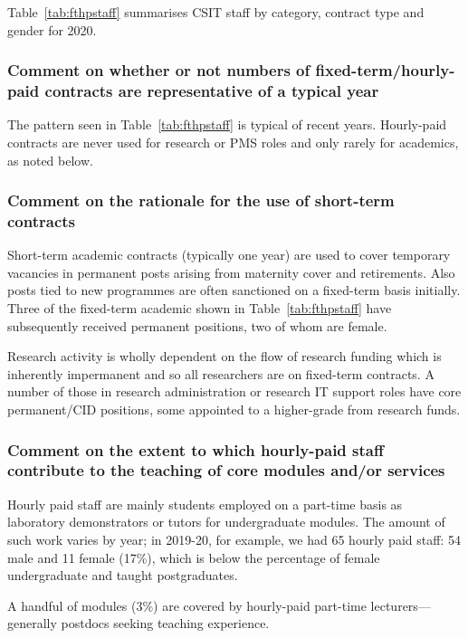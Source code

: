 Table~\ref{tab:fthpstaff} summarises CSIT staff by category, contract 
type and gender for 2020.



\subsubsection{Comment on whether or not numbers of fixed-term/hourly-paid contracts are representative of a typical year}

The  pattern seen in Table~\ref{tab:fthpstaff}
is  typical of recent years. Hourly-paid contracts are 
never used for research or PMS roles and only rarely for 
academics, as noted below.


\subsubsection{Comment on the rationale for the use of short-term contracts}
\label{rationalecontracts}

Short-term academic contracts (typically one year) are used 
to cover temporary vacancies in permanent posts arising from
maternity cover and retirements. Also posts tied to new programmes are often
sanctioned on a fixed-term basis initially.
Three of the fixed-term academic shown in 
Table~\ref{tab:fthpstaff} have subsequently received 
permanent positions, two of whom are female.



Research activity is wholly dependent on the flow of research 
funding which is inherently impermanent and so all researchers 
are on fixed-term contracts. A number of those in research 
administration or research IT support roles have core
permanent/\ac{CID} positions, some appointed to a 
higher-grade from research funds.

\subsubsection{Comment on the extent to which hourly-paid staff contribute to the teaching of core modules and/or services}

Hourly paid staff are mainly students
employed on a part-time basis as laboratory demonstrators or tutors for
undergraduate modules. The amount of such work varies by year; 
in 2019-20, for example, we had 65 hourly paid staff: 54 male and 11 female (17\%), which is below the percentage of 
female undergraduate and taught postgraduates.

A handful of modules (3\%) are covered by hourly-paid part-time lecturers---generally postdocs seeking teaching experience.





